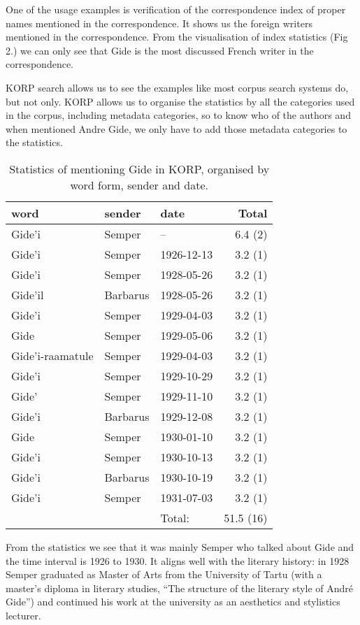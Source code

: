\documentclass[runningheads]{llncs}
\begin{document}
One of the usage examples is verification of the correspondence index of proper names mentioned in the correspondence. It shows us the foreign writers mentioned in the correspondence. From the visualisation of index statistics (Fig 2.) we can only see that Gide is the most discussed French writer in the correspondence.  

KORP search allows us to see the examples like most corpus search systems do, but not only. KORP allows us to organise the statistics by all the categories used in the corpus, including metadata categories, so to know who of the authors and when mentioned Andre Gide, we only have to add those metadata categories to the statistics.

\begin{table}
\caption{Statistics of mentioning Gide in KORP, organised by word form, sender and date.}\label{tab1}
\begin{tabular}{| l | l | l | r|}
  \hline
  word & sender & date & Total\\
  \hline
  Gide'i & Semper & -- & 6.4 (2)\\
  Gide'i & Semper & 1926-12-13 & 3.2 (1)\\
  Gide'i & Semper & 1928-05-26 & 3.2 (1)\\
  Gide'il & Barbarus & 1928-05-26 & 3.2 (1)\\
  Gide'i & Semper & 1929-04-03 & 3.2 (1)\\
  Gide & Semper & 1929-05-06 & 3.2 (1)\\
  Gide'i-raamatule & Semper & 1929-04-03 & 3.2 (1)\\
  Gide'i & Semper & 1929-10-29 & 3.2 (1)\\
  Gide' & Semper & 1929-11-10 & 3.2 (1)\\
  Gide'i & Barbarus & 1929-12-08 & 3.2 (1)\\
  Gide & Semper & 1930-01-10 & 3.2 (1)\\
  Gide'i & Semper & 1930-10-13 & 3.2 (1)\\
  Gide'i & Barbarus & 1930-10-19 & 3.2 (1)\\
  Gide'i & Semper & 1931-07-03 & 3.2 (1)\\
  \hline
  &&Total:&51.5 (16)\\
\hline
\end{tabular}
\end{table}


From the statistics we see that it was mainly Semper who talked about Gide and the time interval is 1926 to 1930. It aligns well with the literary history: in 1928 Semper graduated as Master of Arts from the University of Tartu (with a master’s diploma in literary studies, “The structure of the literary style of Andr\'e Gide”) and continued his work at the university as an aesthetics and stylistics lecturer. 
\end{document}
